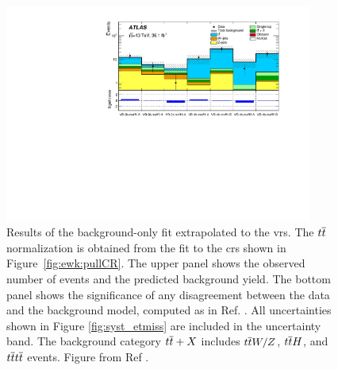 \begin{figure}[htbp]
	\centering
	\includegraphics[width=0.9\textwidth]{figures/ewk_prod/etmiss_results/histpull_pulls_in_VR_qcdStrong}
	\caption{Results of the background-only fit extrapolated to the \glspl{vr}. 
	    The $t\overline{t}$ normalization is obtained from the fit to the \glspl{cr} shown in Figure~\ref{fig:ewk:pullCR}. The upper panel shows 
		the observed number of events and the predicted background yield. The bottom panel shows the significance of any disagreement between the data and the background model, computed as in Ref. \cite{Choudalakis:2011okv}.
		All uncertainties  shown in Figure \ref{fig:syst_etmiss} are included in the 
		uncertainty band. The background category $t\overline{t}+X$ includes $t\overline{t} W/Z$, 
		$t\overline{t} H$, and $t\overline{t} t\overline{t}$ events. Figure from Ref \cite{Aaboud:2018htj}.}
	\label{fig:ewk:pullVR}
\end{figure}

